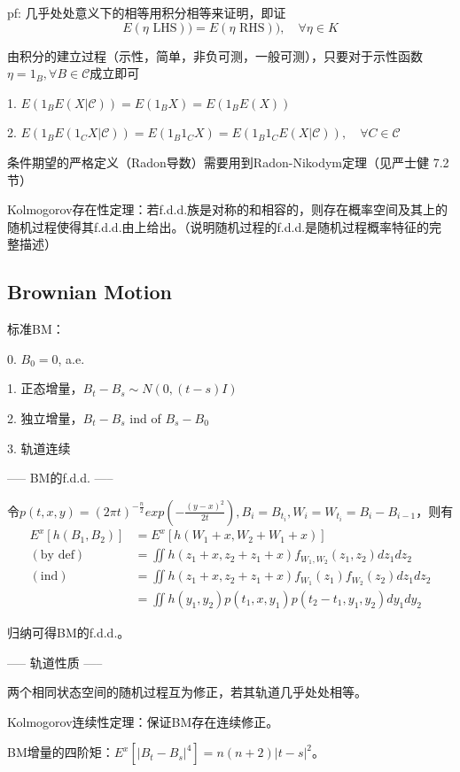 pf: 几乎处处意义下的相等用积分相等来证明，即证
\[
  E(\eta \text{ LHS})) = E(\eta \text{ RHS})), \quad \forall \eta \in K
\]

由积分的建立过程（示性，简单，非负可测，一般可测），只要对于示性函数$\eta = 1_B, \forall B \in \mathcal{C}$成立即可

1. $E(1_B E(X|\mathcal{C})) = E(1_B X) = E(1_B E(X))$

2. $E(1_B E(1_C X|\mathcal{C})) = E(1_B 1_C X) = E(1_B 1_C E(X|\mathcal{C})), \quad \forall C \in \mathcal{C}$

条件期望的严格定义（Radon导数）需要用到Radon-Nikodym定理（见严士健 7.2节）

Kolmogorov存在性定理：若f.d.d.族是对称的和相容的，则存在概率空间及其上的随机过程使得其f.d.d.由上给出。（说明随机过程的f.d.d.是随机过程概率特征的完整描述）

\subsection{Brownian Motion}

标准BM：

0. $B_0 = 0$, a.e.

1. 正态增量，$B_t - B_s \sim N(0, (t - s)I)$

2. 独立增量，$B_t - B_s$ ind of $B_s - B_0$

3. 轨道连续

----- BM的f.d.d. -----

令$p(t, x, y) = {(2 \pi t)}^{- \frac{n}{2}}exp(-\frac{(y - x)^2}{2t}), B_i = B_{t_i}, W_i = W_{t_i} = B_i - B_{i - 1}$，则有
\[
  \begin{aligned}
    E^x[h(B_1, B_2)] &= E^x[h(W_1 + x, W_2 + W_1 + x)]\\
    (\text{by def}) &= \iint h(z_1 + x, z_2 + z_1 + x)f_{W_1, W_2}(z_1, z_2) dz_1 dz_2\\
    (\text{ind}) &= \iint h(z_1 + x, z_2 + z_1 + x)f_{W_1}(z_1)f_{W_2}(z_2) dz_1 dz_2\\
    &= \iint h(y_1, y_2)p(t_1, x, y_1)p(t_2 - t_1, y_1, y_2) dy_1 dy_2
  \end{aligned}
\]

归纳可得BM的f.d.d.。

----- 轨道性质 -----

两个相同状态空间的随机过程互为修正，若其轨道几乎处处相等。

Kolmogorov连续性定理：保证BM存在连续修正。

BM增量的四阶矩：$E^x[|B_t - B_s|^4] = n(n + 2)|t - s|^2$。


